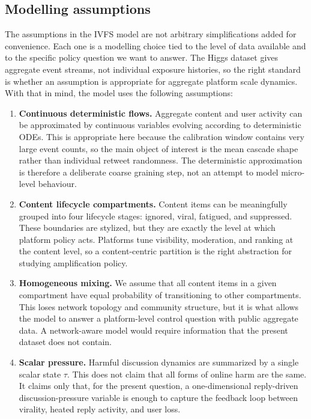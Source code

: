 \documentclass[11pt]{article}
\begin{document}
\subsection{Modelling assumptions}
\label{sec:assumptions}

The assumptions in the IVFS model are not arbitrary simplifications added for convenience. Each one is a modelling choice tied to the level of data available and to the specific policy question we want to answer. The Higgs dataset gives aggregate event streams, not individual exposure histories, so the right standard is whether an assumption is appropriate for aggregate platform scale dynamics. With that in mind, the model uses the following assumptions:

\begin{enumerate}[leftmargin=1.5em]
    \item \textbf{Continuous deterministic flows.} Aggregate content and user activity can be approximated by continuous variables evolving according to deterministic ODEs. This is appropriate here because the calibration window contains very large event counts, so the main object of interest is the mean cascade shape rather than individual retweet randomness. The deterministic approximation is therefore a deliberate coarse graining step, not an attempt to model micro-level behaviour.

    \item \textbf{Content lifecycle compartments.} Content items can be meaningfully grouped into four lifecycle stages: ignored, viral, fatigued, and suppressed. These boundaries are stylized, but they are exactly the level at which platform policy acts. Platforms tune visibility, moderation, and ranking at the content level, so a content-centric partition is the right abstraction for studying amplification policy.

    \item \textbf{Homogeneous mixing.} We assume that all content items in a given compartment have equal probability of transitioning to other compartments. This loses network topology and community structure, but it is what allows the model to answer a platform-level control question with public aggregate data. A network-aware model would require information that the present dataset does not contain.

    \item \textbf{Scalar pressure.} Harmful discussion dynamics are summarized by a single scalar state $\tau$. This does not claim that all forms of online harm are the same. It claims only that, for the present question, a one-dimensional reply-driven discussion-pressure variable is enough to capture the feedback loop between virality, heated reply activity, and user loss.


\end{enumerate}
\end{document}
